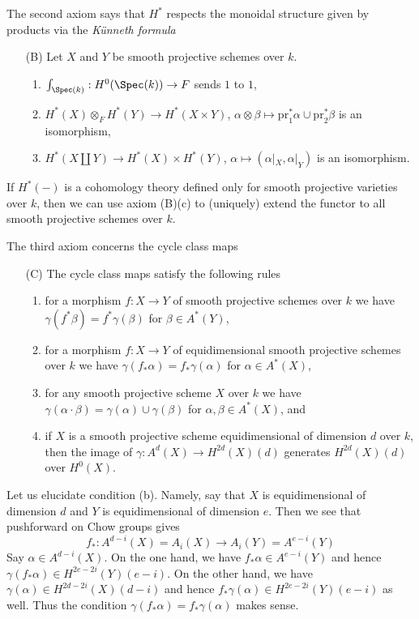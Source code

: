 \noindent
The second axiom says that $H^*$ respects the monoidal structure
given by products via the {\it K\"unneth formula}
\begin{enumerate}
\item[(B)] Let $X$ and $Y$ be smooth projective schemes over $k$.
\begin{enumerate}
\item $\int_{\Spec(k)} : H^0(\Spec(k)) \to F$ sends $1$ to $1$,
\item $H^*(X) \otimes_F H^*(Y) \to H^*(X \times Y)$,
$\alpha \otimes \beta \mapsto \text{pr}_1^*\alpha \cup \text{pr}_2^*\beta$
is an isomorphism,
\item $H^*(X \amalg Y) \to H^*(X) \times H^*(Y)$,
$\alpha \longmapsto (\alpha|_X, \alpha|_Y)$ is an isomorphism.
\end{enumerate}
\end{enumerate}
If $H^*(-)$ is a cohomology theory defined only for smooth projective
varieties over $k$, then we can use axiom (B)(c) to
(uniquely) extend the functor to all smooth projective schemes over $k$.

\medskip\noindent
The third axiom concerns the cycle class maps
\begin{enumerate}
\item[(C)] The cycle class maps satisfy the following rules
\begin{enumerate}
\item for a morphism $f : X \to Y$ of smooth projective schemes over
$k$ we have $\gamma(f^*\beta) = f^*\gamma(\beta)$ for $\beta \in A^*(Y)$,
\item for a morphism $f : X \to Y$ of equidimensional smooth projective schemes
over $k$ we have
$\gamma(f_*\alpha) = f_*\gamma(\alpha)$ for $\alpha \in A^*(X)$,
\item for any smooth projective scheme $X$ over $k$ we have
$\gamma(\alpha \cdot \beta) = \gamma(\alpha) \cup \gamma(\beta)$
for $\alpha, \beta \in A^*(X)$, and
\item if $X$ is a smooth projective scheme equidimensional of dimension $d$
over $k$, then the image of $\gamma : A^d(X) \to H^{2d}(X)(d)$ generates
$H^{2d}(X)(d)$ over $H^0(X)$.
\end{enumerate}
\end{enumerate}
Let us elucidate condition (b). Namely, say that $X$ is equidimensional
of dimension $d$ and $Y$ is equidimensional of dimension $e$. Then we
see that pushforward on Chow groups gives
$$
f_* : A^{d - i}(X) = A_i(X) \to A_i(Y) = A^{e - i}(Y)
$$
Say $\alpha \in A^{d - i}(X)$. On the one hand, we have
$f_*\alpha \in A^{e - i}(Y)$ and hence
$\gamma(f_*\alpha) \in H^{2e - 2i}(Y)(e - i)$.
On the other hand, we have
$\gamma(\alpha) \in H^{2d - 2i}(X)(d - i)$ and hence
$f_*\gamma(\alpha) \in H^{2e - 2i}(Y)(e - i)$ as well.
Thus the condition $\gamma(f_*\alpha) = f_*\gamma(\alpha)$ makes sense.

